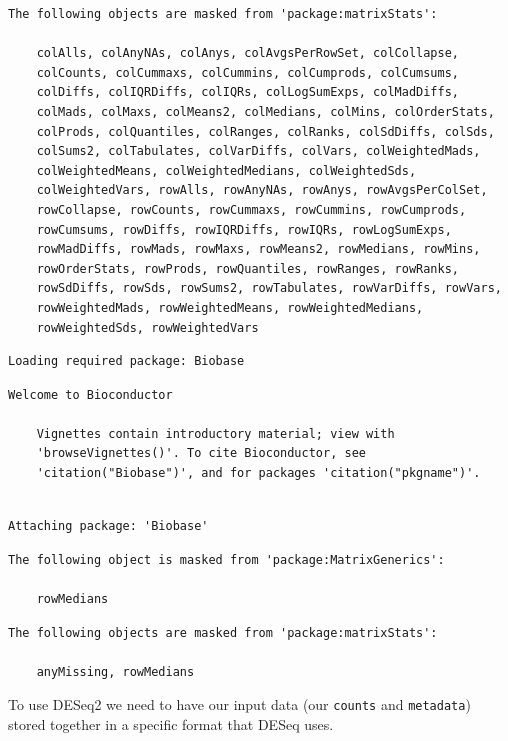 \documentclass[
  letterpaper,
  DIV=11,
  numbers=noendperiod]{scrartcl}
\begin{document}
\begin{verbatim}
The following objects are masked from 'package:matrixStats':

    colAlls, colAnyNAs, colAnys, colAvgsPerRowSet, colCollapse,
    colCounts, colCummaxs, colCummins, colCumprods, colCumsums,
    colDiffs, colIQRDiffs, colIQRs, colLogSumExps, colMadDiffs,
    colMads, colMaxs, colMeans2, colMedians, colMins, colOrderStats,
    colProds, colQuantiles, colRanges, colRanks, colSdDiffs, colSds,
    colSums2, colTabulates, colVarDiffs, colVars, colWeightedMads,
    colWeightedMeans, colWeightedMedians, colWeightedSds,
    colWeightedVars, rowAlls, rowAnyNAs, rowAnys, rowAvgsPerColSet,
    rowCollapse, rowCounts, rowCummaxs, rowCummins, rowCumprods,
    rowCumsums, rowDiffs, rowIQRDiffs, rowIQRs, rowLogSumExps,
    rowMadDiffs, rowMads, rowMaxs, rowMeans2, rowMedians, rowMins,
    rowOrderStats, rowProds, rowQuantiles, rowRanges, rowRanks,
    rowSdDiffs, rowSds, rowSums2, rowTabulates, rowVarDiffs, rowVars,
    rowWeightedMads, rowWeightedMeans, rowWeightedMedians,
    rowWeightedSds, rowWeightedVars
\end{verbatim}

\begin{verbatim}
Loading required package: Biobase
\end{verbatim}

\begin{verbatim}
Welcome to Bioconductor

    Vignettes contain introductory material; view with
    'browseVignettes()'. To cite Bioconductor, see
    'citation("Biobase")', and for packages 'citation("pkgname")'.
\end{verbatim}

\begin{verbatim}

Attaching package: 'Biobase'
\end{verbatim}

\begin{verbatim}
The following object is masked from 'package:MatrixGenerics':

    rowMedians
\end{verbatim}

\begin{verbatim}
The following objects are masked from 'package:matrixStats':

    anyMissing, rowMedians
\end{verbatim}

To use DESeq2 we need to have our input data (our \texttt{counts} and
\texttt{metadata}) stored together in a specific format that DESeq uses.
\end{document}
